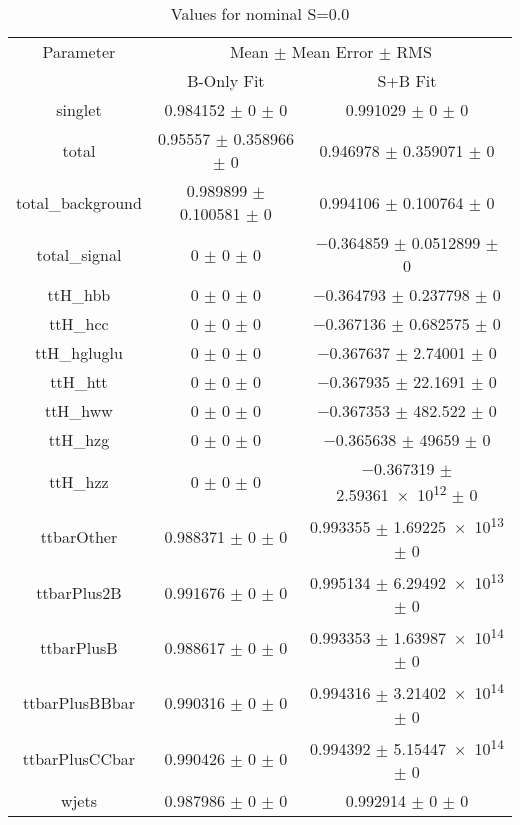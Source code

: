 \begin{table}
\centering
\caption{Values for nominal S=0.0}
\begin{tabular}{ccc}
\toprule
Parameter & \multicolumn{2}{c}{Mean $\pm$ Mean Error $\pm$ RMS}\\
 & B-Only Fit & S+B Fit\\
\midrule
singlet & \num{0.984152} $\pm$ \num{0} $\pm$ \num{0} & \num{0.991029} $\pm$ \num{0} $\pm$ \num{0}\\
total & \num{0.95557} $\pm$ \num{0.358966} $\pm$ \num{0} & \num{0.946978} $\pm$ \num{0.359071} $\pm$ \num{0}\\
total\_background & \num{0.989899} $\pm$ \num{0.100581} $\pm$ \num{0} & \num{0.994106} $\pm$ \num{0.100764} $\pm$ \num{0}\\
total\_signal & \num{0} $\pm$ \num{0} $\pm$ \num{0} & \num{-0.364859} $\pm$ \num{0.0512899} $\pm$ \num{0}\\
ttH\_hbb & \num{0} $\pm$ \num{0} $\pm$ \num{0} & \num{-0.364793} $\pm$ \num{0.237798} $\pm$ \num{0}\\
ttH\_hcc & \num{0} $\pm$ \num{0} $\pm$ \num{0} & \num{-0.367136} $\pm$ \num{0.682575} $\pm$ \num{0}\\
ttH\_hgluglu & \num{0} $\pm$ \num{0} $\pm$ \num{0} & \num{-0.367637} $\pm$ \num{2.74001} $\pm$ \num{0}\\
ttH\_htt & \num{0} $\pm$ \num{0} $\pm$ \num{0} & \num{-0.367935} $\pm$ \num{22.1691} $\pm$ \num{0}\\
ttH\_hww & \num{0} $\pm$ \num{0} $\pm$ \num{0} & \num{-0.367353} $\pm$ \num{482.522} $\pm$ \num{0}\\
ttH\_hzg & \num{0} $\pm$ \num{0} $\pm$ \num{0} & \num{-0.365638} $\pm$ \num{49659} $\pm$ \num{0}\\
ttH\_hzz & \num{0} $\pm$ \num{0} $\pm$ \num{0} & \num{-0.367319} $\pm$ \num{2.59361e+12} $\pm$ \num{0}\\
ttbarOther & \num{0.988371} $\pm$ \num{0} $\pm$ \num{0} & \num{0.993355} $\pm$ \num{1.69225e+13} $\pm$ \num{0}\\
ttbarPlus2B & \num{0.991676} $\pm$ \num{0} $\pm$ \num{0} & \num{0.995134} $\pm$ \num{6.29492e+13} $\pm$ \num{0}\\
ttbarPlusB & \num{0.988617} $\pm$ \num{0} $\pm$ \num{0} & \num{0.993353} $\pm$ \num{1.63987e+14} $\pm$ \num{0}\\
ttbarPlusBBbar & \num{0.990316} $\pm$ \num{0} $\pm$ \num{0} & \num{0.994316} $\pm$ \num{3.21402e+14} $\pm$ \num{0}\\
ttbarPlusCCbar & \num{0.990426} $\pm$ \num{0} $\pm$ \num{0} & \num{0.994392} $\pm$ \num{5.15447e+14} $\pm$ \num{0}\\
wjets & \num{0.987986} $\pm$ \num{0} $\pm$ \num{0} & \num{0.992914} $\pm$ \num{0} $\pm$ \num{0}\\
\bottomrule
\end{tabular}
\end{table}